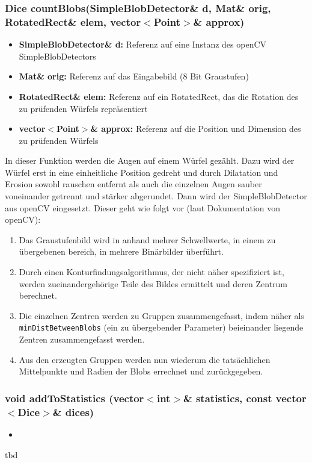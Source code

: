 \documentclass{../Vorlage/sebDenCls}
\begin{document}
\subsubsection{Dice countBlobs(SimpleBlobDetector\& d, Mat\& orig, RotatedRect\& elem, vector$<$Point$>$\& approx)}
\begin{itemize}
	\item \textbf{SimpleBlobDetector\& d:} Referenz auf eine Instanz des openCV SimpleBlobDetectors
	\item \textbf{Mat\& orig:} Referenz auf das Eingabebild (8 Bit Graustufen)
	\item \textbf{RotatedRect\& elem:} Referenz auf ein RotatedRect, das die Rotation des zu prüfenden Würfels repräsentiert
	\item \textbf{vector$<$Point$>$\& approx:} Referenz auf die Position und Dimension des zu prüfenden Würfels
\end{itemize}
In dieser Funktion werden die Augen auf einem Würfel gezählt. Dazu wird der Würfel erst in eine einheitliche Position gedreht und durch Dilatation und Erosion sowohl rauschen entfernt als auch die einzelnen Augen sauber voneinander getrennt und stärker abgerundet. Dann wird der SimpleBlobDetector aus openCV eingesetzt. Dieser geht wie folgt vor (laut Dokumentation von openCV):\\
\begin{enumerate}
	\item Das Graustufenbild wird in anhand mehrer Schwellwerte, in einem zu übergebenen bereich, in mehrere Binärbilder überführt.
	\item Durch einen Konturfindungsalgorithmus, der nicht näher spezifiziert ist, werden zueinandergehörige Teile des Bildes ermittelt und deren Zentrum berechnet.
	\item Die einzelnen Zentren werden zu Gruppen zusammengefasst, indem näher als \texttt{minDistBetweenBlobs} (ein zu übergebender Parameter) beieinander liegende Zentren zusammengefasst werden.
	\item Aus den erzeugten Gruppen werden nun wiederum die tatsächlichen Mittelpunkte und Radien der Blobs errechnet und zurückgegeben.
\end{enumerate}

\subsubsection{void addToStatistics (vector$<$int$>$\& statistics, const vector$<$Dice$>$\& dices)}
\begin{itemize}
	\item 
\end{itemize}
tbd
\end{document}
